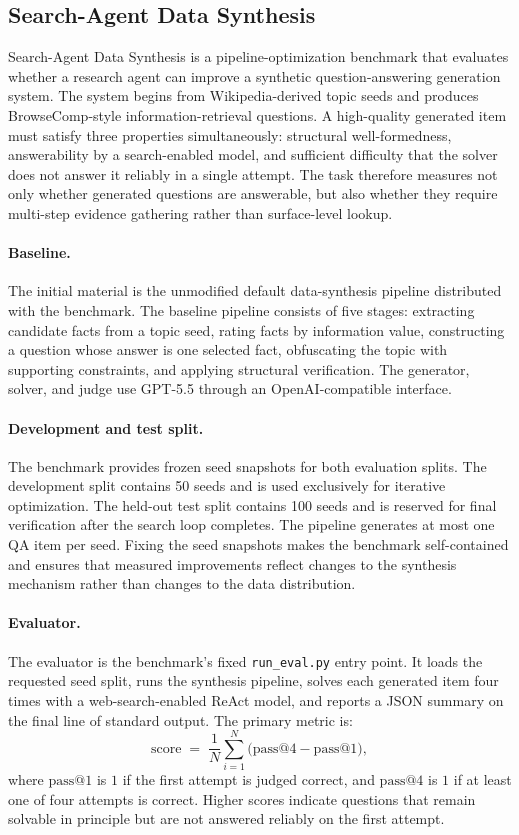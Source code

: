\documentclass{llmxive}
\begin{document}
\subsection{Search-Agent Data Synthesis}
\label{app:benchmark-search-agent-data}

Search-Agent Data Synthesis is a pipeline-optimization benchmark that
evaluates whether a research agent can improve a synthetic question-answering
generation system.
The system begins from Wikipedia-derived topic seeds and produces
BrowseComp-style information-retrieval questions.
A high-quality generated item must satisfy three properties simultaneously:
structural well-formedness, answerability by a search-enabled model, and
sufficient difficulty that the solver does not answer it reliably in a single
attempt.
The task therefore measures not only whether generated questions are
answerable, but also whether they require multi-step evidence gathering rather
than surface-level lookup.

\paragraph{Baseline.}
The initial material is the unmodified default data-synthesis pipeline
distributed with the benchmark.
The baseline pipeline consists of five stages: extracting candidate facts from
a topic seed, rating facts by information value, constructing a question whose
answer is one selected fact, obfuscating the topic with supporting constraints,
and applying structural verification.
The generator, solver, and judge use GPT-5.5 through an OpenAI-compatible
interface.

\paragraph{Development and test split.}
The benchmark provides frozen seed snapshots for both evaluation splits.
The development split contains 50 seeds and is used exclusively for iterative
optimization.
The held-out test split contains 100 seeds and is reserved for final
verification after the search loop completes.
The pipeline generates at most one QA item per seed.
Fixing the seed snapshots makes the benchmark self-contained and ensures that
measured improvements reflect changes to the synthesis mechanism rather than
changes to the data distribution.

\paragraph{Evaluator.}
The evaluator is the benchmark's fixed \texttt{run\_eval.py} entry point.
It loads the requested seed split, runs the synthesis pipeline, solves each
generated item four times with a web-search-enabled ReAct model, and reports
a JSON summary on the final line of standard output.
The primary metric is:
\[
\mathrm{score}
\;=\;
\frac{1}{N}\sum_{i=1}^{N}
\bigl(\mathrm{pass@4} - \mathrm{pass@1}\bigr),
\]
where $\mathrm{pass@1}$ is $1$ if the first attempt is judged correct, and
$\mathrm{pass@4}$ is $1$ if at least one of four attempts is correct.
Higher scores indicate questions that remain solvable in principle but are
not answered reliably on the first attempt.
\end{document}
